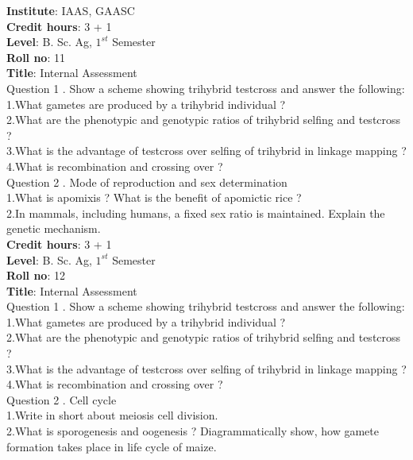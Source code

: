 \documentclass[12pt]{article}\usepackage[]{graphicx}\usepackage[]{color}
\begin{document}
{            \textbf{Institute}: IAAS, GAASC \\}\textbf{Credit hours}: 3 + 1 \\\textbf{Level}: B. Sc. Ag, $1^{st}$ Semester \\\textbf{Roll no}: 11 \\\textbf{Title}: Internal Assessment \\[1cm]Question 1 . Show a scheme showing trihybrid testcross and answer the following: \\\hspace{0.5cm}1.What gametes are produced by a trihybrid individual ?\\\hspace{0.5cm}2.What are the phenotypic and genotypic ratios of trihybrid selfing and testcross ?\\\hspace{0.5cm}3.What is the advantage of testcross over selfing of trihybrid in linkage mapping ?\\\hspace{0.5cm}4.What is recombination and crossing over ?\\Question 2 . Mode of reproduction and sex determination \\\hspace{0.5cm}1.What is apomixis ? What is the benefit of apomictic rice ?\\\hspace{0.5cm}2.In mammals, including humans, a fixed sex ratio is maintained. Explain the genetic mechanism.\\\textbf{Credit hours}: 3 + 1 \\\textbf{Level}: B. Sc. Ag, $1^{st}$ Semester \\\textbf{Roll no}: 12 \\\textbf{Title}: Internal Assessment \\[1cm]Question 1 . Show a scheme showing trihybrid testcross and answer the following: \\\hspace{0.5cm}1.What gametes are produced by a trihybrid individual ?\\\hspace{0.5cm}2.What are the phenotypic and genotypic ratios of trihybrid selfing and testcross ?\\\hspace{0.5cm}3.What is the advantage of testcross over selfing of trihybrid in linkage mapping ?\\\hspace{0.5cm}4.What is recombination and crossing over ?\\Question 2 . Cell cycle \\\hspace{0.5cm}1.Write in short about meiosis cell division.\\\hspace{0.5cm}2.What is sporogenesis and oogenesis ? Diagrammatically show, how gamete formation takes place in life cycle of maize.\\\clearpage{\centering
}
\end{document}
